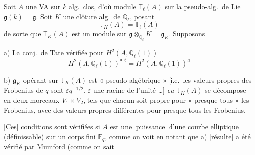 \documentclass[11pt,a4paper]{article}
\begin{document}
Soit $A$ une VA sur $k$ alg.\ clos, d'où module $\mathbb{T}_{\ell}(A)$
\struck{\ill{}} sur la pseudo-alg.\ de Lie \struck{\ill{}}
$\mathfrak{g}(k) = \mathfrak{g}$. Soit $K$ une clôture alg.\ de
$\mathbb{Q}_{\ell}$, posant
\[
  \mathbb{T}_{K}(A) = \mathbb{T}_{\ell}(A)
\]
de sorte que $\mathbb{T}_{K}(A)$ est un module sur $\mathfrak{g}
\otimes_{\mathbb{Q}_{\ell}} K = \mathfrak{g}_{K}$. Supposons

a) La \struck{\ill{}} conj.\ de Tate vérifiée pour $H^{2}(A,
\mathbb{Q}_{\ell}(1))$
\[
  H^{2}(A, \mathbb{Q}_{\ell}(1))^{\mathrm{alg}} = H^{2}(A,
  \mathbb{Q}_{\ell}(1))^{\mathfrak{g}}
\]

b) $\mathfrak{g}_{K}$ opérant sur  $\mathbb{T}_{K}(A)$
est « pseudo-algébrique » [i.e.\ les valeurs propres des Frobenius
 de \ill{} $q$ sont $\varepsilon q^{-1/2}$, $\varepsilon$ une
racine de l'unité …] \emph{ou} $\mathbb{T}_{K}(A)$ se décompose en deux
morceaux $V_{1} \times V_{2}$, tels que chacun soit propre pour « presque
tous » les Frobenius, avec des valeurs propres différentes pour presque tous
les Frobenius.

[Ces] conditions sont vérifiées si $A$ est une [puissance]
 d'une courbe elliptique (définissable) sur un corps fini
$\mathbb{F}_{q}$, comme on voit en notant que a) [résulte]  a été
vérifié par Mumford (comme on sait
\end{document}
